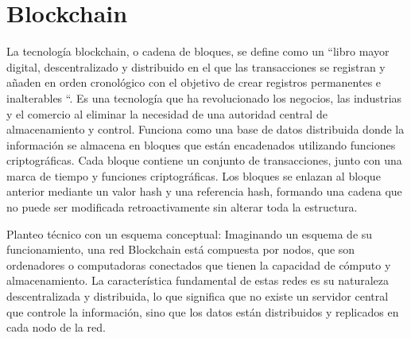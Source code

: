 


\section{Blockchain}
La tecnología blockchain, o cadena de bloques, se define como un ``libro mayor digital, descentralizado y distribuido en el que las transacciones se registran y añaden en orden cronológico con el objetivo de crear registros permanentes e inalterables ``. Es una tecnología que ha revolucionado los negocios, las industrias y el comercio al eliminar la necesidad de una autoridad central de almacenamiento y control. Funciona como una base de datos distribuida donde la información se almacena en bloques que están encadenados utilizando funciones criptográficas. Cada bloque contiene un conjunto de transacciones, junto con una marca de tiempo y funciones criptográficas. Los bloques se enlazan al bloque anterior mediante un valor hash y una referencia hash, formando una cadena que no puede ser modificada retroactivamente sin alterar toda la estructura.

Planteo técnico con un esquema conceptual: Imaginando un esquema de su funcionamiento, una red Blockchain está compuesta por nodos, que son ordenadores o computadoras conectados que tienen la capacidad de cómputo y almacenamiento. La característica fundamental de estas redes es su naturaleza descentralizada y distribuida, lo que significa que no existe un servidor central que controle la información, sino que los datos están distribuidos y replicados en cada nodo de la red.

